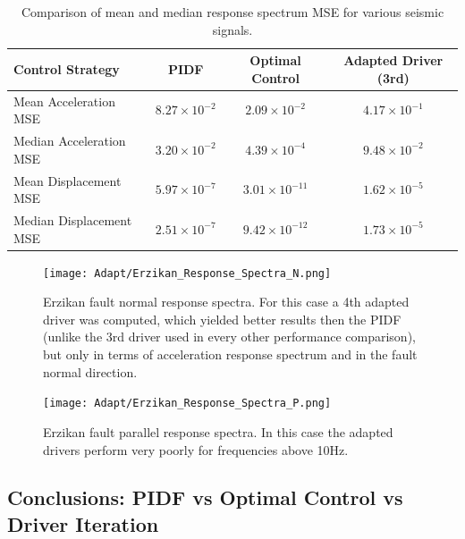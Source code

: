 \documentclass[9pt]{extarticle}
\begin{document}
\begin{table}[ht]
\centering
\begin{tabular}{lccc}
\hline
Control Strategy  & PIDF & Optimal Control & Adapted Driver (3rd)\\
\hline
Mean Acceleration MSE     & \(8.27 \times 10^{-2}\) & \(2.09 \times 10^{-2}\) & \(4.17 \times 10^{-1}\) \\
Median Acceleration MSE   & \(3.20 \times 10^{-2}\) & \(4.39 \times 10^{-4}\) & \(9.48 \times 10^{-2}\) \\
Mean Displacement MSE  & \(5.97 \times 10^{-7}\) & \(3.01 \times 10^{-11}\) & \(1.62 \times 10^{-5}\) \\
Median Displacement MSE & \(2.51 \times 10^{-7}\) & \(9.42 \times 10^{-12}\) & \(1.73 \times 10^{-5}\) \\
\hline
\end{tabular}
\caption{Comparison of mean and median response spectrum MSE for various seismic signals.}
\label{tab:metrics_comparison}
\end{table}


\begin{figure}[H]
    \centering
    \texttt{[image: Adapt/Erzikan\_Response\_Spectra\_N.png]}
    \caption{Erzikan fault normal response spectra. For this case a 4th adapted driver was computed, which yielded better results then the PIDF (unlike the 3rd driver used in every other performance comparison), but only in terms of acceleration response spectrum and in the fault normal direction.}
    \label{erzikan_4th_N}
\end{figure}

\begin{figure}[H]
    \centering
    \texttt{[image: Adapt/Erzikan\_Response\_Spectra\_P.png]}
    \caption{Erzikan fault parallel response spectra. In this case the adapted drivers perform very poorly for frequencies above 10Hz.}
    \label{erzikan_4th_P}
\end{figure}


\subsection{ Conclusions: PIDF vs Optimal Control vs Driver Iteration }

\end{document}
